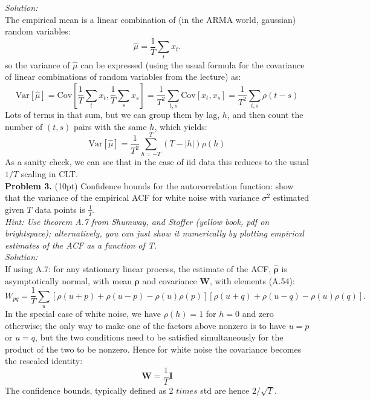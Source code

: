 \documentclass[12pt]{article}
\begin{document}
\noindent \emph{Solution:}\\
The empirical mean is a linear combination of (in the ARMA world, gaussian) random variables:
\begin{equation}
\hat{\mu} = \frac{1}{T} \sum_t x_t.
\end{equation}
so the variance of $\hat{\mu}$ can be expressed (using the usual formula for the covariance of linear combinations of random variables from the lecture) as:
\begin{equation}
\mathrm{Var}[\hat{\mu} ]=  \mathrm{Cov}\left[ \frac{1}{T} \sum_t x_t,  \frac{1}{T} \sum_s x_s\right] = \frac{1}{T^2} \sum_{t,s} \mathrm{Cov}[x_t,x_s] = \frac{1}{T^2} \sum_{t,s}\rho(t-s)
\end{equation}
Lots of terms in that sum, but we can group them by lag, $h$, and then count the number of $(t,s)$ pairs with the same $h$, which yields:
\begin{equation}
\mathrm{Var}[\hat{\mu} ] = \frac{1}{T^2} \sum_{h=-T}^T (T-|h|)\rho(h)
\end{equation}
As a sanity check, we can see that in the case of iid data this reduces to the usual $1/T$ scaling in CLT.\\


\noindent \textbf{Problem 3. } (10pt) Confidence bounds for the autocorrelation function: 
show that the variance of the empirical ACF for white noise with variance $\sigma^2$ estimated given $T$ data points is $\frac{1}{T}$.\\
\emph{Hint: Use theorem A.7 from Shumway, and  Stoffer  (yellow book, pdf on brightspace); alternatively, you can just show it numerically by plotting empirical estimates of the ACF as a function of T. }\\

\noindent \emph{Solution:}\\
If using A.7: for any  stationary linear process, the estimate of the ACF, $\boldsymbol{\hat{\rho}}$  is asymptotically normal, with mean $\boldsymbol{\rho}$ and covariance $\mathbf{W}$, with elements (A.54):
\begin{equation}
W_{pq} = \frac{1}{T}\sum_u \left[ \rho(u+p) +\rho(u-p) - \rho(u)\rho(p) \right] \left[ \rho(u+q) +\rho(u-q) - \rho(u)\rho(q) \right].
\end{equation}
In the special case of white noise, we have $\rho(h) = 1$ for $h=0$ and zero otherwise;  the only way to make one of the factors above nonzero is to have $u=p$ or $u=q$, but the two conditions need to be satisfied simultaneously for the product of the two to be nonzero. Hence for white noise the  covariance becomes the rescaled identity: 
$$\mathbf{W}=\frac{1}{T} \mathbf{I}$$
The confidence bounds, typically defined as 2 $times$ std are hence $2/\sqrt{T}$.\\
\end{document}
